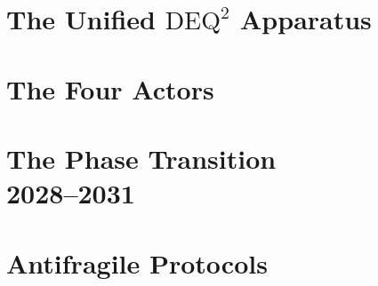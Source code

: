 \documentclass[12pt, twoside]{book}
\theoremstyle{plain}
\theoremstyle{definition}
\theoremstyle{remark}
\newcommand{\deq}{\mathrm{DEQ}^2}
\begin{document}
\part{The Unified \texorpdfstring{$\deq$}{DEQ²} Apparatus}




\part{The Four Actors}






\part[The Phase Transition 2028--2031]{The Phase Transition\\2028--2031}




\part{Antifragile Protocols}




\appendix





\end{document}
